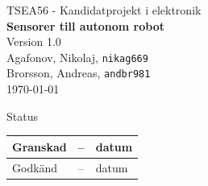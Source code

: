 \documentclass[11pt]{article}
\date{}
\begin{document}
\begin{titlepage}
\begin{center}
TSEA56 - Kandidatprojekt i elektronik \\[0.5in]
{\Large\bfseries Sensorer till autonom robot }\\
%
\vspace{4\baselineskip}
%
Version 1.0\\
\vspace{2\baselineskip}
%
Agafonov, Nikolaj, 
\texttt{nikag669}
\\
Brorsson, Andreas, 
\texttt{andbr981}
\\


\vspace{2\baselineskip}
\today

\vspace{23\baselineskip}
Status
\begin{table}[b]
\centering
\begin{tabular}{|l|l|l|} \hline
 Granskad & -- & datum  \\ \hline
 Godkänd  & -- & datum \\ \hline 
\end{tabular}
\end{table}

\end{center}
\end{titlepage}
\end{document}
